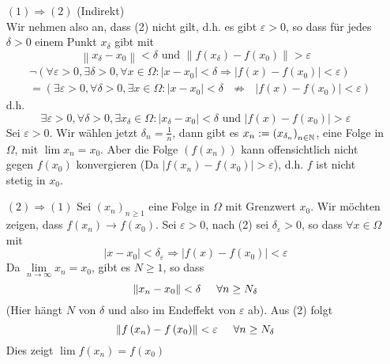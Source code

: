 \begin{beweis}{4.18}
\begin{enumerate}[align=left]
\item[$(1)\Rightarrow (2)$] (Indirekt)\\
Wir nehmen also an, dass (2) nicht gilt, d.h. es gibt $\varepsilon>0$, so dass für jedes $\delta >0$ einem Punkt $x_\delta$ gibt mit
\[\left\| {{x_\delta } - {x_0}} \right\| < \delta {\text{ und }}\left\| {f\left( {{x_\delta }} \right) - f\left( {{x_0}} \right)} \right\| > \varepsilon \]
\begin{align*}
&\neg \left( {\forall \varepsilon  > 0,\exists \delta  > 0,\forall x \in \Omega :\left| {x - {x_0}} \right| < \delta  \Rightarrow \left| {f\left( x \right) - f\left( {{x_0}} \right)} \right| < \varepsilon } \right)\\
 &= \left( {\exists \varepsilon  > 0,\forall \delta  > 0,\exists x \in \Omega :\left| {x - {x_0}} \right| < \delta {\text{ }}\not  \Rightarrow {\text{ }}\left| {f\left( x \right) - f\left( {{x_0}} \right)} \right| < \varepsilon } \right)
\end{align*}
d.h.
\[\exists \varepsilon  > 0,\forall \delta  > 0,\exists {x_\delta } \in \Omega :\left| {{x_\delta } - {x_0}} \right| < \delta {\text{  und  }}\left| {f\left( x \right) - f\left( {{x_0}} \right)} \right| > \varepsilon \]
Sei $\varepsilon>0$. Wir wählen jetzt $\delta_n=\frac{1}{n}$, dann gibt es $x_n:=\left(x_{\delta_n}\right)_{n\in\mathbb{N}}$, eine Folge in $\Omega$, mit $\lim x_n=x_0$. Aber die Folge $\left( f\left( x_n\right)\right)$ kann offensichtlich nicht gegen $f\left( x_0\right)$ konvergieren (Da $\left| {f\left( {{x_n}} \right) - f\left( {{x_0}} \right)} \right| > \varepsilon $), d.h. $f$ ist nicht stetig in $x_0$.
\item[$(2)\Rightarrow (1)$] Sei $\left( x_n\right)_{n\geq 1}$ eine Folge in $\Omega$ mit Grenzwert $x_0$. Wir möchten zeigen, dass $f\left( {{x_n}} \right) \to f\left( {{x_0}} \right)$. Sei $\varepsilon>0$, nach (2) sei $\delta_{\varepsilon}>0$, so dass $\forall x\in\Omega$ mit
\[\left| {x - {x_0}} \right| < {\delta _\varepsilon } \Rightarrow \left| {f\left( x \right) - f\left( {{x_0}} \right)} \right| < \varepsilon \]
Da $\mathop {\lim }\limits_{n \to \infty } {x_n} = {x_0}$, gibt es $N\geq 1$, so dass
\[\left\| {{x_n} - {x_0}} \right\| < \delta\hspace{5mm} \forall n \ge {N_\delta }\]
(Hier hängt $N$ von $\delta$ und also im Endeffekt von $\varepsilon$ ab). Aus (2) folgt
\[\left\| {f\left( {{x_n}} \right) - f\left( {{x_0}} \right)} \right\| < \varepsilon \hspace{5mm}\forall n \ge {N_\delta }\]
Dies zeigt $\lim f\left( {{x_n}} \right) = f\left( {{x_0}} \right)$
\end{enumerate}
\end{beweis}

